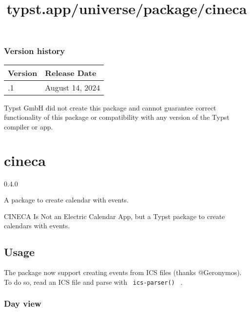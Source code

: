 \label{versions}
\subsubsection{Version history}\label{version-history}

\begin{longtable}[]{@{}ll@{}}
\toprule\noalign{}
Version & Release Date \\
\midrule\noalign{}
\endhead
\bottomrule\noalign{}
\endlastfoot
0.3.1 & August 14, 2024 \\
\end{longtable}

Typst GmbH did not create this package and cannot guarantee correct
functionality of this package or compatibility with any version of the
Typst compiler or app.


\title{typst.app/universe/package/cineca}

\label{banner}
\section{cineca}\label{cineca}

{ 0.4.0 }

A package to create calendar with events.

\label{readme}
CINECA Is Not an Electric Calendar App, but a Typst package to create
calendars with events.

\subsection{Usage}\label{usage}

The package now support creating events from ICS files (thanks
@Geronymos). To do so, read an ICS file and parse with
\texttt{\ ics-parser()\ } .

\begin{Shaded}
\begin{Highlighting}[]
\NormalTok{))}

\end{Highlighting}
\end{Shaded}

\subsubsection{Day view}\label{day-view}

